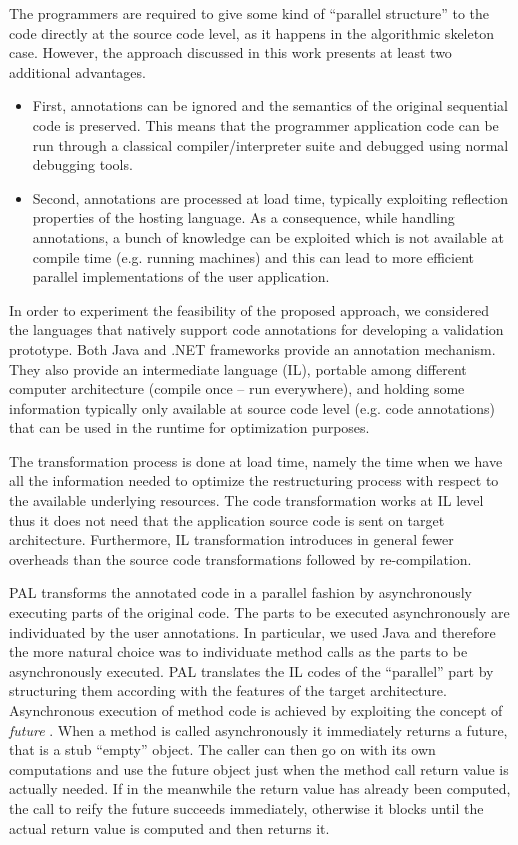 \documentclass{acm_proc_article-sp}
\begin{document}
The programmers are required to give some kind of ``parallel structure'' to the code directly at the source code level, as it happens in the algorithmic skeleton case. However, the approach discussed in this work presents at least two additional advantages.
\begin{itemize}
\item
First, annotations can be ignored and the semantics of the original sequential code is preserved. This means that the programmer application code can be run through a classical compiler/interpreter suite and debugged using normal debugging tools.
\item
Second, annotations are processed at load time, typically exploiting reflection properties of the hosting language. As a consequence, while handling annotations, a bunch of knowledge can be exploited which is not available at compile time (e.g. running machines) and this can lead to more efficient parallel implementations of the user application.
\end{itemize}

In order to experiment the feasibility of the proposed approach, we considered the languages that natively support code annotations for developing a validation prototype.
Both Java and .NET frameworks provide an annotation mechanism. They also provide an intermediate language (IL), portable among different computer architecture (compile once -- run everywhere), and holding some information typically only available at source code level (e.g. code annotations) that can be used in the runtime for optimization purposes.

The transformation process is done at load time, namely the time when we have all the information needed to optimize the restructuring process with respect to the available underlying resources. The code transformation works at IL level thus it does not need that the application source code is sent on target architecture. Furthermore, IL transformation introduces in general fewer overheads than the source code transformations followed by re-compilation.

PAL transforms the annotated code in a parallel fashion by asynchronously executing parts of the original code. The parts to be executed asynchronously are individuated by the user annotations.  In particular, we used Java and therefore the more natural choice was to individuate method calls as the parts to be asynchronously executed. PAL translates the IL codes of the ``parallel'' part by structuring them according with the features of the target architecture.
Asynchronous execution of method code is achieved by exploiting the concept of \emph{future} \cite{caromel05theory, caromel04asynchronous}. When a method is called asynchronously it immediately returns a future, that is a stub ``empty'' object. The caller can then go on with its own computations and use the future object just when the method call return value is actually needed. If in the meanwhile the return value has already been computed, the call to reify the future succeeds immediately, otherwise it blocks until the actual return value is computed and then returns it.
\end{document}
